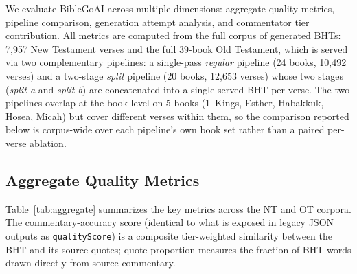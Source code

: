 We evaluate BibleGoAI across multiple dimensions: aggregate quality metrics, pipeline comparison, generation attempt analysis, and commentator tier contribution. All metrics are computed from the full corpus of generated BHTs: 7{,}957 New Testament verses and the full 39-book Old Testament, which is served via two complementary pipelines: a single-pass \emph{regular} pipeline (24 books, 10{,}492 verses) and a two-stage \emph{split} pipeline (20 books, 12{,}653 verses) whose two stages (\emph{split-a} and \emph{split-b}) are concatenated into a single served BHT per verse. The two pipelines overlap at the book level on 5 books (1~Kings, Esther, Habakkuk, Hosea, Micah) but cover different verses within them, so the comparison reported below is corpus-wide over each pipeline's own book set rather than a paired per-verse ablation.

\subsection{Aggregate Quality Metrics}

Table~\ref{tab:aggregate} summarizes the key metrics across the NT and OT corpora. The commentary-accuracy score (identical to what is exposed in legacy JSON outputs as \texttt{qualityScore}) is a composite tier-weighted similarity between the BHT and its source quotes; quote proportion measures the fraction of BHT words drawn directly from source commentary.

